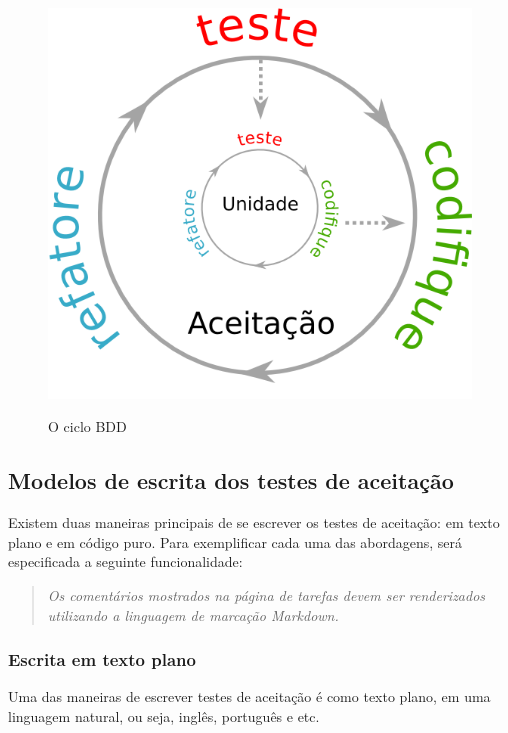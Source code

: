 \begin{figure}[h]
  \center
  \caption{O ciclo BDD}
  \includegraphics[scale=0.45]{images/ciclo-bdd}
  \label{img:ciclo-bdd}
\end{figure}


\subsection{Modelos de escrita dos testes de aceitação}
\label{sub:modelos_de_escrita_dos_testes_de_aceitacao}

Existem duas maneiras principais de se escrever os testes de aceitação: em texto plano e em código puro. Para exemplificar cada uma das abordagens, será especificada a seguinte funcionalidade:

\begin{quote}
\textit{Os comentários mostrados na página de tarefas devem ser renderizados utilizando a linguagem de marcação Markdown.}
\end{quote}

\subsubsection{Escrita em texto plano} %
\label{subsub:escrita_em_texto_plano}

Uma das maneiras de escrever testes de aceitação é como texto plano, em uma linguagem natural, ou seja, inglês, português e etc.

